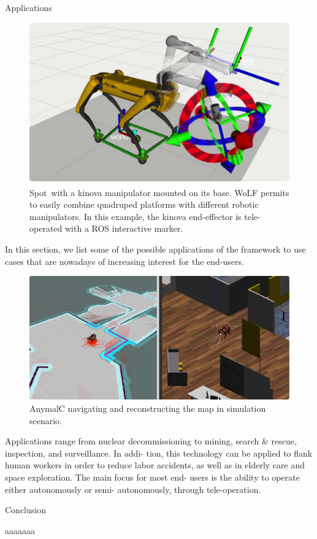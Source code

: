 	
	
\vspace{-20pt}	
\begin{myblock}{\large Applications} 
	
	
\begin{figure}[thb!]
	\centering
	\includegraphics[width=0.5\columnwidth]{images/spot_arm.pdf}
	\caption{Spot\textsuperscript\textregistered \  with a kinova manipulator mounted on its base. WoLF permits to easily combine quadruped platforms with different robotic manipulators. In this example, the kinova end-effector is tele-operated with a ROS interactive marker.}
	\label{fig:spot_arm}
\end{figure}



In this section, we list some of the possible applications of the framework to use cases that are nowadays of increasing interest for the end-users. 
%
\begin{figure}[thb!]
	\centering
	\includegraphics[width=0.5\columnwidth]{images/anymalc_navigation.pdf}
	\caption{AnymalC navigating and reconstructing the map in simulation scenario.}
	\label{fig:anymalc_navigation}
\end{figure}
%	
	
Applications range from nuclear decommissioning to mining, search \& rescue, inspection, and surveillance. In addi-
tion, this technology can be applied to flank human workers
in order to reduce labor accidents, as well as in elderly
care and space exploration. The main focus for most end-
users is the ability to operate either autonomously or semi-
autonomously, through tele-operation.


\end{myblock}

\vspace{-20pt}
\begin{myblock}{{\large Conclusion}}
\begin{beameritemize}
	\item aaaaaaa	
\end{beameritemize}
	
\end{myblock} 